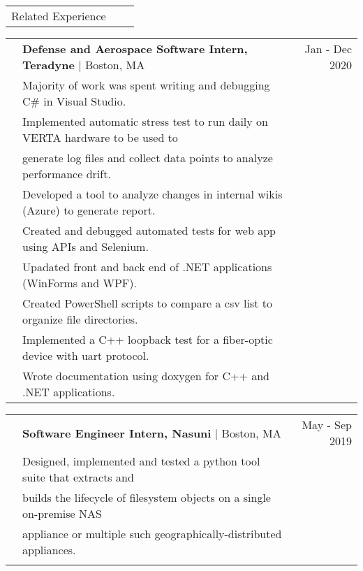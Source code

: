 \documentclass[letterpaper,10pt,oneside]{article}
\begin{document}
\noindent \begin{tabularx}{\linewidth}{@{} l l R }
     \Large{Related Experience}\\
\end{tabularx}

\noindent \begin{tabularx}{\linewidth}{@{} l l R }
     & \textbf{Defense and Aerospace Software Intern, Teradyne} $\mid$ Boston, MA & Jan - Dec 2020 \\
     & Majority of work was spent writing and debugging C\# in Visual Studio.\\
     & Implemented automatic stress test to run daily on VERTA hardware to be used to\\
     & \indent generate log files and collect data points to analyze performance drift.\\
     & Developed a tool to analyze changes in internal wikis (Azure) to generate report.\\
     & Created and debugged automated tests for web app using APIs and Selenium.\\
     & Upadated front and back end of .NET applications (WinForms and WPF).\\
     & Created PowerShell scripts to compare a csv list to organize file directories.\\
     & Implemented a C++ loopback test for a fiber-optic device with uart protocol.\\
     & Wrote documentation using doxygen for C++ and .NET applications.\\
\end {tabularx}

\noindent \begin{tabularx}{\linewidth}{@{} l l R }
     & \textbf{Software Engineer Intern, Nasuni} $\mid$ Boston, MA & May - Sep 2019 \\
     & Designed, implemented and tested a python tool suite that extracts and\\
     & \indent builds the lifecycle of filesystem objects on a single on-premise NAS\\
     & \indent appliance or multiple such geographically-distributed appliances.\\
     \\
\end{tabularx}
\end{document}
